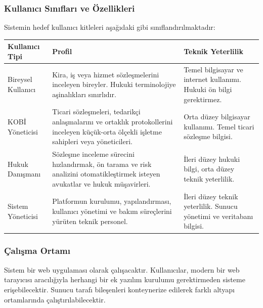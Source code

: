 \documentclass[12pt, a4paper]{article}
\begin{document}
\subsubsection{Kullanıcı Sınıfları ve Özellikleri}
Sistemin hedef kullanıcı kitleleri aşağıdaki gibi sınıflandırılmaktadır:

\begin{longtable}{|p{3cm}|p{5.5cm}|p{5cm}|}
\hline
\textbf{Kullanıcı Tipi} & \textbf{Profil} & \textbf{Teknik Yeterlilik} \\
\hline
Bireysel Kullanıcı & Kira, iş veya hizmet sözleşmelerini inceleyen bireyler. Hukuki terminolojiye aşinalıkları sınırlıdır. & Temel bilgisayar ve internet kullanımı. Hukuki ön bilgi gerektirmez. \\
\hline
KOBİ Yöneticisi & Ticari sözleşmeleri, tedarikçi anlaşmalarını ve ortaklık protokollerini inceleyen küçük-orta ölçekli işletme sahipleri veya yöneticileri. & Orta düzey bilgisayar kullanımı. Temel ticari sözleşme bilgisi. \\
\hline
Hukuk Danışmanı & Sözleşme inceleme sürecini hızlandırmak, ön tarama ve risk analizini otomatikleştirmek isteyen avukatlar ve hukuk müşavirleri. & İleri düzey hukuki bilgi, orta düzey teknik yeterlilik. \\
\hline
Sistem Yöneticisi & Platformun kurulumu, yapılandırması, kullanıcı yönetimi ve bakım süreçlerini yürüten teknik personel. & İleri düzey teknik yeterlilik. Sunucu yönetimi ve veritabanı bilgisi. \\
\hline
\end{longtable}

\subsubsection{Çalışma Ortamı}
Sistem bir web uygulaması olarak çalışacaktır. Kullanıcılar, modern bir web tarayıcısı aracılığıyla herhangi bir ek yazılım kurulumu gerektirmeden sisteme erişebilecektir. Sunucu tarafı bileşenleri konteynerize edilerek farklı altyapı ortamlarında çalıştırılabilecektir.
\end{document}

